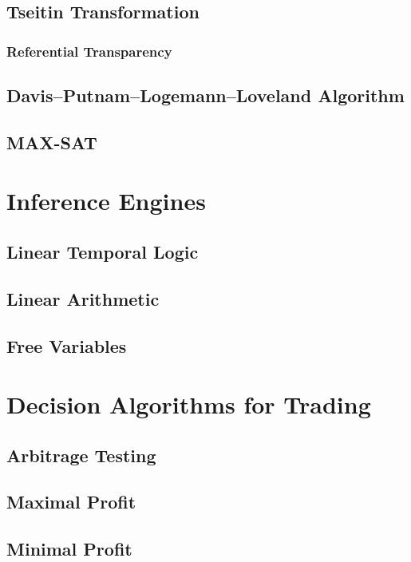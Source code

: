 \documentclass[a4paper,11pt]{book}
\begin{document}
\subsection{Tseitin Transformation}
\subsubsection{Referential Transparency}
\subsection{Davis–Putnam–Logemann–Loveland Algorithm}
\subsection{MAX-SAT}
\section{Inference Engines}
\subsection{Linear Temporal Logic}
\subsection{Linear Arithmetic}
\subsection{Free Variables}
\section{Decision Algorithms for Trading}
\subsection{Arbitrage Testing}
\subsection{Maximal Profit}
\subsection{Minimal Profit}



\end{document}
